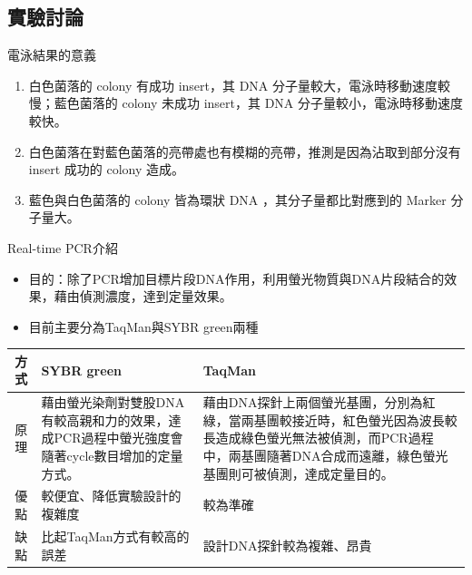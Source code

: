 \subsection*{實驗討論}


\dsc 電泳結果的意義 
\begin{enumerate}[label=\arabic*.]
  \item 白色菌落的 colony 有成功 insert，其 DNA 分子量較大，電泳時移動速度較慢；藍色菌落的 colony 未成功 insert，其 DNA 分子量較小，電泳時移動速度較快。
  \item 白色菌落在對藍色菌落的亮帶處也有模糊的亮帶，推測是因為沾取到部分沒有 insert 成功的 colony 造成。
  \item 藍色與白色菌落的 colony 皆為環狀 DNA ，其分子量都比對應到的 Marker 分子量大。

\end{enumerate}


\newpage

\dsc Real-time PCR介紹

\begin{itemize}[leftmargin=0cm,]
  \item[] 目的：除了PCR增加目標片段DNA作用，利用螢光物質與DNA片段結合的效果，藉由偵測濃度，達到定量效果。
  \item[] 目前主要分為TaqMan與SYBR green兩種
\end{itemize}

\begin{table}[h]
\centering
\setlength{\abovecaptionskip}{0cm} %
\begin{tabular}{cp{6cm}p{6cm}}
\toprule
方式&SYBR green&TaqMan\\

\midrule
原理&藉由螢光染劑對雙股DNA有較高親和力的效果，達成PCR過程中螢光強度會隨著cycle數目增加的定量方式。&藉由DNA探針上兩個螢光基團，分別為紅綠，當兩基團較接近時，紅色螢光因為波長較長造成綠色螢光無法被偵測，而PCR過程中，兩基團隨著DNA合成而遠離，綠色螢光基團則可被偵測，達成定量目的。\\
\midrule
優點&較便宜、降低實驗設計的複雜度&較為準確\\
\midrule
缺點&比起TaqMan方式有較高的誤差&設計DNA探針較為複雜、昂貴\\
\bottomrule


\end{tabular}\end{table}





% 
%
